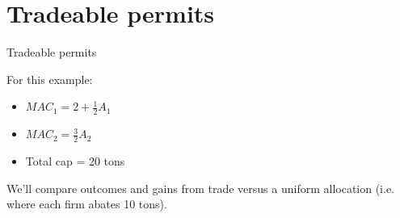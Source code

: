 \documentclass[
hyperref={colorlinks,citecolor=blue,linkcolor=blue,urlcolor=blue}
]{beamer}
\begin{document}

\section{Tradeable permits}


\begin{frame}{Tradeable permits}

	For this example:
	\begin{itemize}
		\item {\color{myred}$MAC_1 = 2 + \frac{1}{2}A_1$}
		\item {\color{myblue}$MAC_2 = \frac{3}{2}A_2$}
		\item Total cap = 20 tons
	\end{itemize}

	We'll compare outcomes and gains from trade versus a uniform allocation (i.e. where each firm abates 10 tons).
	
\end{frame}

\end{document}
